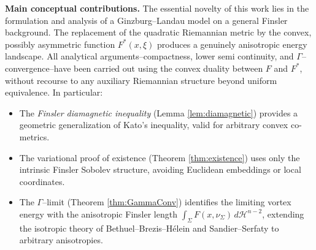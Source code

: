 \documentclass[fleqn,11pt,twoside]{article}
\theoremstyle{definition}
\begin{document}
\medskip
\noindent
\textbf{Main conceptual contributions.}
The essential novelty of this work lies in the formulation and analysis of a Ginzburg--Landau model on a general Finsler background. The replacement of the quadratic Riemannian metric by the convex, possibly asymmetric function $F^*(x,\xi)$ produces a genuinely anisotropic energy landscape.
All analytical arguments--compactness, lower semi continuity,
and $\Gamma$--convergence--have been carried out using the
convex duality between $F$ and $F^*$, without recourse to
any auxiliary Riemannian structure beyond uniform equivalence.
In particular:
\begin{itemize}
\item 
The \emph{Finsler diamagnetic inequality}
(Lemma \ref{lem:diamagnetic}) provides a geometric generalization
of Kato’s inequality, valid for arbitrary convex co-metrics.

\item 
The variational proof of existence (Theorem \ref{thm:existence})
uses only the intrinsic Finsler Sobolev structure, avoiding
Euclidean embeddings or local coordinates.

\item 
The $\Gamma$--limit (Theorem \ref{thm:GammaConv}) identifies the limiting vortex energy with the anisotropic Finsler length $\int_\Sigma F(x,\nu_\Sigma)\,d\mathcal{H}^{n-2}$, extending the isotropic theory of Bethuel--Brezis--H\'elein and Sandier--Serfaty to arbitrary anisotropies.
\end{itemize}

\end{document}

